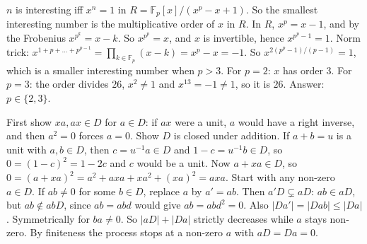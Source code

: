 \documentclass[11pt,a4paper]{article}
\begin{document}
 $n$ is interesting iff $x^n=1$ in $R=\mathbb F_p[x]/(x^p-x+1)$. So the smallest interesting number is the multiplicative order of $x$ in $R$.
 In $R$, $x^p=x-1$, and by the Frobenius $x^{p^k}=x-k$. So $x^{p^p}=x$, and $x$ is invertible, hence $x^{p^p-1}=1$.
 Norm trick: $x^{1+p+\dots+p^{p-1}}=\prod_{k\in\mathbb F_p}(x-k)=x^p-x=-1$. So $x^{2(p^p-1)/(p-1)}=1$, which is a smaller interesting number when $p>3$.
 For $p=2$: $x$ has order $3$. For $p=3$: the order divides $26$, $x^2\ne1$ and $x^{13}=-1\ne1$, so it is $26$. Answer: $p\in\{2,3\}$.

 First show $xa,ax\in D$ for $a\in D$: if $ax$ were a unit, $a$ would have a right inverse, and then $a^2=0$ forces $a=0$.
 Show $D$ is closed under addition. If $a+b=u$ is a unit with $a,b\in D$, then $c=u^{-1}a\in D$ and $1-c=u^{-1}b\in D$, so $0=(1-c)^2=1-2c$ and $c$ would be a unit.
 Now $a+xa\in D$, so $0=(a+xa)^2=a^2+axa+xa^2+(xa)^2=axa$.
 Start with any non-zero $a\in D$. If $ab\ne0$ for some $b\in D$, replace $a$ by $a'=ab$. Then $a'D\subsetneq aD$: $ab\in aD$, but $ab\notin abD$, since $ab=abd$ would give $ab=abd^2=0$. Also $|Da'|=|Dab|\le|Da|$.
 Symmetrically for $ba\ne0$. So $|aD|+|Da|$ strictly decreases while $a$ stays non-zero. By finiteness the process stops at a non-zero $a$ with $aD=Da=0$.
\end{document}
